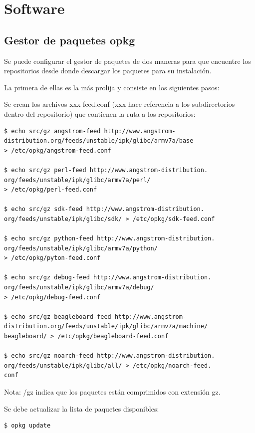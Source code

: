\chapter{Software}\label{anx_sw}

\section{Gestor de paquetes opkg}\label{opkg}
Se puede configurar el gestor de paquetes de dos maneras para que encuentre los repositorios desde donde descargar los paquetes para su instalación. 

\bigskip
La primera de ellas es la más prolija y consiste en los siguientes pasos: 

\bigskip
Se crean los archivos xxx-feed.conf (xxx hace referencia a los subdirectorios dentro del repositorio) que contienen la ruta a los repositorios: 

\begin{verbatim}
$ echo src/gz angstrom-feed http://www.angstrom-
distribution.org/feeds/unstable/ipk/glibc/armv7a/base  
> /etc/opkg/angstrom-feed.conf 

$ echo src/gz perl-feed http://www.angstrom-distribution.
org/feeds/unstable/ipk/glibc/armv7a/perl/ 
> /etc/opkg/perl-feed.conf 

$ echo src/gz sdk-feed http://www.angstrom-distribution.
org/feeds/unstable/ipk/glibc/sdk/ > /etc/opkg/sdk-feed.conf 

$ echo src/gz python-feed http://www.angstrom-distribution.
org/feeds/unstable/ipk/glibc/armv7a/python/
> /etc/opkg/pyton-feed.conf 

$ echo src/gz debug-feed http://www.angstrom-distribution.
org/feeds/unstable/ipk/glibc/armv7a/debug/ 
> /etc/opkg/debug-feed.conf 

$ echo src/gz beagleboard-feed http://www.angstrom-
distribution.org/feeds/unstable/ipk/glibc/armv7a/machine/
beagleboard/ > /etc/opkg/beagleboard-feed.conf 

$ echo src/gz noarch-feed http://www.angstrom-distribution.
org/feeds/unstable/ipk/glibc/all/ > /etc/opkg/noarch-feed.
conf 
\end{verbatim}

Nota: /gz indica que los paquetes están comprimidos con extensión gz. 

\bigskip
Se debe actualizar la lista de paquetes disponibles:

\bigskip
\begin{verbatim}
$ opkg update
\end{verbatim}


